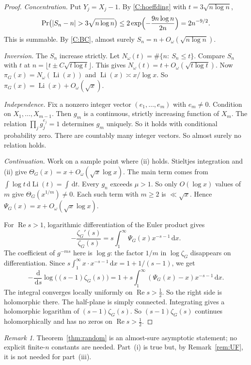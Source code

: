 \documentclass[12pt,letterpaper]{article}
\theoremstyle{definition}
\theoremstyle{remark}
\newtheorem{remark}[theorem]{Remark}
\numberwithin{equation}{section}
\newcommand{\Li}{\operatorname{Li}}
\newcommand{\Ree}{\operatorname{Re}}
\newcommand{\dd}{\,\mathrm{d}}
\begin{document}
\begin{proof}
\emph{Concentration.} Put $Y_j=X_j-1$. By \ref{C:hoeffding} with
$t=3\sqrt{n\log n}$,
\[
\Pr\bigl(|S_n-n|>3\sqrt{n\log n}\bigr)\le2\exp\Bigl(-\frac{9n\log n}{2n}\Bigr)
=2n^{-9/2}.
\]
This is summable. By \ref{C:BC}, almost surely
$S_n=n+O_\omega(\sqrt{n\log n})$.

\emph{Inversion.} The $S_n$ increase strictly. Let
$N_\omega(t)=\#\{n:\ S_n\le t\}$. Compare $S_n$ with $t$ at
$n=\lfloor t\pm C\sqrt{t\log t}\rfloor$. This gives
$N_\omega(t)=t+O_\omega(\sqrt{t\log t})$. Now $\pi_G(x)=N_\omega(\Li(x))$
and $\Li(x)\asymp x/\log x$. So $\pi_G(x)=\Li(x)+O_\omega(\sqrt{x})$.

\emph{Independence.} Fix a nonzero integer vector $(e_1,\dots,e_m)$ with
$e_m\ne0$. Condition on $X_1,\dots,X_{m-1}$. Then $g_m$ is a continuous,
strictly increasing function of $X_m$. The relation
$\prod_jg_j^{e_j}=1$ determines $g_m$ uniquely. So it holds with
conditional probability zero. There are countably many integer vectors.
So almost surely no relation holds.

\emph{Continuation.} Work on a sample point where (ii) holds. Stieltjes
integration and (ii) give $\Theta_G(x)=x+O_\omega(\sqrt{x}\log x)$. The main
term comes from $\int\log t\dd\Li(t)=\int\dd t$. Every $g_n$ exceeds $\mu>1$.
So only $O(\log x)$ values of $m$ give $\Theta_G(x^{1/m})\ne0$. Each such
term with $m\ge2$ is $\ll\sqrt{x}$. Hence $\Psi_G(x)=x+O_\omega(\sqrt{x}\log
x)$.

For $\Ree s>1$, logarithmic differentiation of the Euler product gives
\[
-\frac{\zeta_G'(s)}{\zeta_G(s)}=s\int_1^\infty\Psi_G(x)x^{-s-1}\dd x.
\]
The coefficient of $g^{-ms}$ here is $\log g$: the factor $1/m$ in
$\log\zeta_G$ disappears on differentiation. Since $s\int_1^\infty x\cdot x^{-s-1}\dd x=1+1/(s-1)$, we
get
\[
-\frac{\dd}{\dd s}\log\bigl((s-1)\zeta_G(s)\bigr)
=1+s\int_1^\infty(\Psi_G(x)-x)x^{-s-1}\dd x.
\]
The integral converges locally uniformly on $\Ree s>\frac12$. So the right
side is holomorphic there. The half-plane is simply connected. Integrating
gives a holomorphic logarithm of $(s-1)\zeta_G(s)$. So $(s-1)\zeta_G(s)$
continues holomorphically and has no zeros on $\Ree s>\frac12$.
\end{proof}

\begin{remark}
Theorem~\ref{thm:random} is an almost-sure asymptotic statement; no
explicit finite-$n$ constants are needed. Part~(i) is true but, by
Remark~\ref{rem:UF}, it is not needed for part~(iii).
\end{remark}
\end{document}
